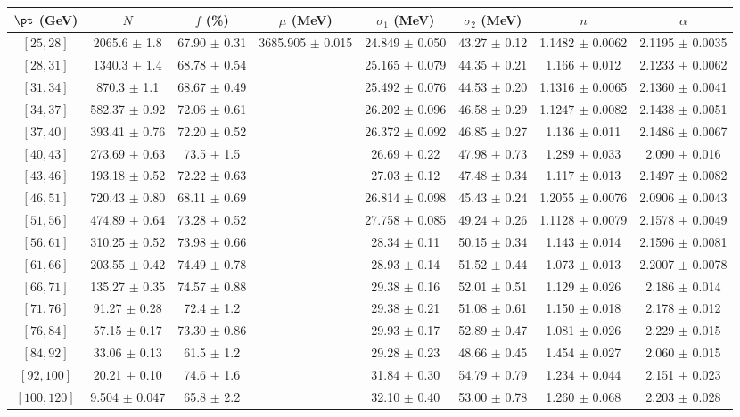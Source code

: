 \begin{tabular}{c||c|c|c|c|c|c|c}
$\pt$ (GeV) & $N$ & $f$ (\%) & $\mu$ (MeV) & $\sigma_1$ (MeV) & $\sigma_2$ (MeV) & $n$ & $\alpha$ \\
\hline
$[25, 28]$ & 2065.6 $\pm$ 1.8 & 67.90 $\pm$ 0.31 & \multirow{17}{*}{3685.905 $\pm$ 0.015} & 24.849 $\pm$ 0.050 & 43.27 $\pm$ 0.12 & 1.1482 $\pm$ 0.0062 & 2.1195 $\pm$ 0.0035\\
$[28, 31]$ & 1340.3 $\pm$ 1.4 & 68.78 $\pm$ 0.54 &  & 25.165 $\pm$ 0.079 & 44.35 $\pm$ 0.21 & 1.166 $\pm$ 0.012 & 2.1233 $\pm$ 0.0062\\
$[31, 34]$ & 870.3 $\pm$ 1.1 & 68.67 $\pm$ 0.49 &  & 25.492 $\pm$ 0.076 & 44.53 $\pm$ 0.20 & 1.1316 $\pm$ 0.0065 & 2.1360 $\pm$ 0.0041\\
$[34, 37]$ & 582.37 $\pm$ 0.92 & 72.06 $\pm$ 0.61 &  & 26.202 $\pm$ 0.096 & 46.58 $\pm$ 0.29 & 1.1247 $\pm$ 0.0082 & 2.1438 $\pm$ 0.0051\\
$[37, 40]$ & 393.41 $\pm$ 0.76 & 72.20 $\pm$ 0.52 &  & 26.372 $\pm$ 0.092 & 46.85 $\pm$ 0.27 & 1.136 $\pm$ 0.011 & 2.1486 $\pm$ 0.0067\\
$[40, 43]$ & 273.69 $\pm$ 0.63 & 73.5 $\pm$ 1.5 &  & 26.69 $\pm$ 0.22 & 47.98 $\pm$ 0.73 & 1.289 $\pm$ 0.033 & 2.090 $\pm$ 0.016\\
$[43, 46]$ & 193.18 $\pm$ 0.52 & 72.22 $\pm$ 0.63 &  & 27.03 $\pm$ 0.12 & 47.48 $\pm$ 0.34 & 1.117 $\pm$ 0.013 & 2.1497 $\pm$ 0.0082\\
$[46, 51]$ & 720.43 $\pm$ 0.80 & 68.11 $\pm$ 0.69 &  & 26.814 $\pm$ 0.098 & 45.43 $\pm$ 0.24 & 1.2055 $\pm$ 0.0076 & 2.0906 $\pm$ 0.0043\\
$[51, 56]$ & 474.89 $\pm$ 0.64 & 73.28 $\pm$ 0.52 &  & 27.758 $\pm$ 0.085 & 49.24 $\pm$ 0.26 & 1.1128 $\pm$ 0.0079 & 2.1578 $\pm$ 0.0049\\
$[56, 61]$ & 310.25 $\pm$ 0.52 & 73.98 $\pm$ 0.66 &  & 28.34 $\pm$ 0.11 & 50.15 $\pm$ 0.34 & 1.143 $\pm$ 0.014 & 2.1596 $\pm$ 0.0081\\
$[61, 66]$ & 203.55 $\pm$ 0.42 & 74.49 $\pm$ 0.78 &  & 28.93 $\pm$ 0.14 & 51.52 $\pm$ 0.44 & 1.073 $\pm$ 0.013 & 2.2007 $\pm$ 0.0078\\
$[66, 71]$ & 135.27 $\pm$ 0.35 & 74.57 $\pm$ 0.88 &  & 29.38 $\pm$ 0.16 & 52.01 $\pm$ 0.51 & 1.129 $\pm$ 0.026 & 2.186 $\pm$ 0.014\\
$[71, 76]$ & 91.27 $\pm$ 0.28 & 72.4 $\pm$ 1.2 &  & 29.38 $\pm$ 0.21 & 51.08 $\pm$ 0.61 & 1.150 $\pm$ 0.018 & 2.178 $\pm$ 0.012\\
$[76, 84]$ & 57.15 $\pm$ 0.17 & 73.30 $\pm$ 0.86 &  & 29.93 $\pm$ 0.17 & 52.89 $\pm$ 0.47 & 1.081 $\pm$ 0.026 & 2.229 $\pm$ 0.015\\
$[84, 92]$ & 33.06 $\pm$ 0.13 & 61.5 $\pm$ 1.2 &  & 29.28 $\pm$ 0.23 & 48.66 $\pm$ 0.45 & 1.454 $\pm$ 0.027 & 2.060 $\pm$ 0.015\\
$[92, 100]$ & 20.21 $\pm$ 0.10 & 74.6 $\pm$ 1.6 &  & 31.84 $\pm$ 0.30 & 54.79 $\pm$ 0.79 & 1.234 $\pm$ 0.044 & 2.151 $\pm$ 0.023\\
$[100, 120]$ & 9.504 $\pm$ 0.047 & 65.8 $\pm$ 2.2 &  & 32.10 $\pm$ 0.40 & 53.00 $\pm$ 0.78 & 1.260 $\pm$ 0.068 & 2.203 $\pm$ 0.028\\
\end{tabular}
